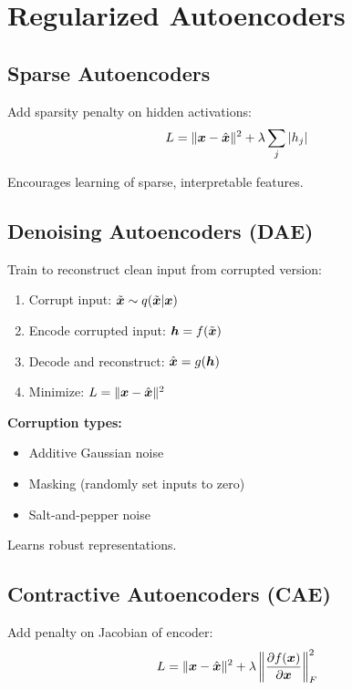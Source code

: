 
\section{Regularized Autoencoders}
\label{sec:regularized-ae}

\subsection{Sparse Autoencoders}

Add sparsity penalty on hidden activations:
\begin{equation}
L = \|\boldsymbol{x} - \hat{\boldsymbol{x}}\|^2 + \lambda \sum_j |h_j|
\end{equation}

Encourages learning of sparse, interpretable features.

\subsection{Denoising Autoencoders (DAE)}

Train to reconstruct clean input from corrupted version:
\begin{enumerate}
    \item Corrupt input: $\tilde{\boldsymbol{x}} \sim q(\tilde{\boldsymbol{x}}|\boldsymbol{x})$
    \item Encode corrupted input: $\boldsymbol{h} = f(\tilde{\boldsymbol{x}})$
    \item Decode and reconstruct: $\hat{\boldsymbol{x}} = g(\boldsymbol{h})$
    \item Minimize: $L = \|\boldsymbol{x} - \hat{\boldsymbol{x}}\|^2$
\end{enumerate}

\textbf{Corruption types:}
\begin{itemize}
    \item Additive Gaussian noise
    \item Masking (randomly set inputs to zero)
    \item Salt-and-pepper noise
\end{itemize}

Learns robust representations.

\subsection{Contractive Autoencoders (CAE)}

Add penalty on Jacobian of encoder:
\begin{equation}
L = \|\boldsymbol{x} - \hat{\boldsymbol{x}}\|^2 + \lambda \left\|\frac{\partial f(\boldsymbol{x})}{\partial \boldsymbol{x}}\right\|_F^2
\end{equation}

